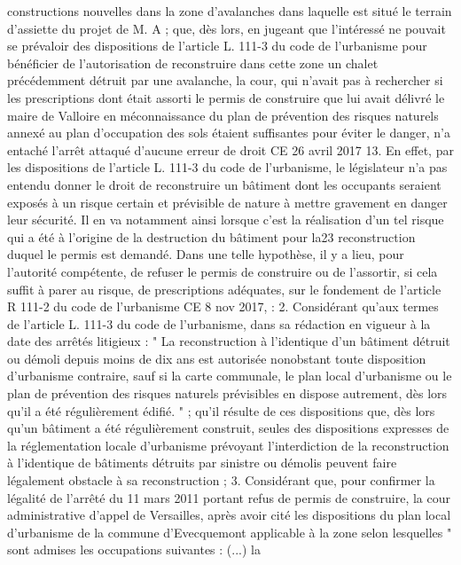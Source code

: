 \documentclass[11pt,a4paper]{report}
\begin{document}
	constructions nouvelles dans la zone d'avalanches dans laquelle est situé le terrain d'assiette du projet de M. A ;
	que, dès lors, en jugeant que l'intéressé ne pouvait se prévaloir des dispositions de l'article L. 111-3 du code de
	l'urbanisme pour bénéficier de l'autorisation de reconstruire dans cette zone un chalet précédemment détruit par
	une avalanche, la cour, qui n'avait pas à rechercher si les prescriptions dont était assorti le permis de construire
	que lui avait délivré le maire de Valloire en méconnaissance du plan de prévention des risques naturels annexé
	au plan d'occupation des sols étaient suffisantes pour éviter le danger, n'a entaché l'arrêt attaqué d'aucune
	erreur de droit
	CE 26 avril 2017  13. En effet, par les dispositions de l'article L. 111-3 du code de l'urbanisme, le
	législateur n'a pas entendu donner le droit de reconstruire un bâtiment dont les occupants seraient exposés à un
	risque certain et prévisible de nature à mettre gravement en danger leur sécurité. Il en va notamment ainsi
	lorsque c'est la réalisation d'un tel risque qui a été à l'origine de la destruction du bâtiment pour la23
	reconstruction duquel le permis est demandé. Dans une telle hypothèse, il y a lieu, pour l'autorité compétente, de
	refuser le permis de construire ou de l'assortir, si cela suffit à parer au risque, de prescriptions adéquates, sur le
	fondement de l'article R 111-2 du code de l'urbanisme
	CE 8 nov 2017,  : 2. Considérant qu'aux termes de l'article L. 111-3 du code de l'urbanisme, dans sa
	rédaction en vigueur à la date des arrêtés litigieux : " La reconstruction à l'identique d'un bâtiment détruit ou
	démoli depuis moins de dix ans est autorisée nonobstant toute disposition d'urbanisme contraire, sauf si la carte
	communale, le plan local d'urbanisme ou le plan de prévention des risques naturels prévisibles en dispose
	autrement, dès lors qu'il a été régulièrement édifié. " ; qu'il résulte de ces dispositions que, dès lors qu'un
	bâtiment a été régulièrement construit, seules des dispositions expresses de la réglementation locale
	d'urbanisme prévoyant l'interdiction de la reconstruction à l'identique de bâtiments détruits par sinistre ou
	démolis peuvent faire légalement obstacle à sa reconstruction ;
	3. Considérant que, pour confirmer la légalité de l'arrêté du 11 mars 2011 portant refus de permis de construire,
	la cour administrative d'appel de Versailles, après avoir cité les dispositions du plan local d'urbanisme de la
	commune d'Evecquemont applicable à la zone selon lesquelles " sont admises les occupations suivantes : (...) la
\end{document}
